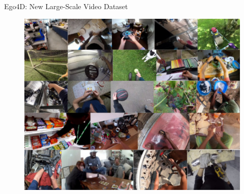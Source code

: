 \begin{frame}[allowframebreaks]{Ego4D: New Large-Scale Video Dataset}
\begin{itemize}
    \end{itemize}
\framebreak
    \begin{figure}
        \centering
        \includegraphics[width=1\textwidth,height=0.9\textheight,keepaspectratio]{images/video/slide_42_1_img.jpg}
    \end{figure}
\end{frame}
    